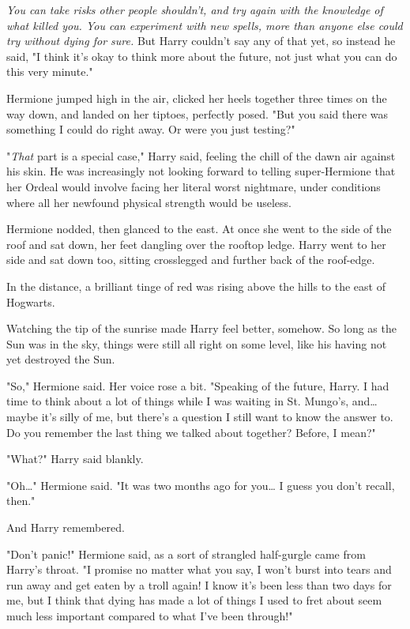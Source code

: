 \emph{You can take risks other people shouldn't, and try again with the
knowledge of what killed you. You can experiment with new spells, more than
anyone else could try without dying for sure.} But Harry couldn't say any of
that yet, so instead he said, "I think it's okay to think more about the
future, not just what you can do this very minute."

Hermione jumped high in the air, clicked her heels together three times on the
way down, and landed on her tiptoes, perfectly posed. "But you said there was
something I could do right away. Or were you just testing?"

"\emph{That} part is a special case," Harry said, feeling the chill of the dawn
air against his skin. He was increasingly not looking forward to telling
super-Hermione that her Ordeal would involve facing her literal worst
nightmare, under conditions where all her newfound physical strength would be
useless.

Hermione nodded, then glanced to the east. At once she went to the side of the
roof and sat down, her feet dangling over the rooftop ledge. Harry went to her
side and sat down too, sitting crosslegged and further back of the roof-edge.

In the distance, a brilliant tinge of red was rising above the hills to the
east of Hogwarts.

Watching the tip of the sunrise made Harry feel better, somehow. So long as the
Sun was in the sky, things were still all right on some level, like his having
not yet destroyed the Sun.

"So," Hermione said. Her voice rose a bit. "Speaking of the future, Harry. I
had time to think about a lot of things while I was waiting in St. Mungo's,
and{\ldots} maybe it's silly of me, but there's a question I still want to know
the answer to. Do you remember the last thing we talked about together? Before,
I mean?"

"What?" Harry said blankly.

"Oh{\ldots}" Hermione said. "It was two months ago for you{\ldots} I guess you
don't recall, then."

And Harry remembered.

"Don't panic!" Hermione said, as a sort of strangled half-gurgle came from
Harry's throat. "I promise no matter what you say, I won't burst into tears and
run away and get eaten by a troll again! I know it's been less than two days
for me, but I think that dying has made a lot of things I used to fret about
seem much less important compared to what I've been through!"

